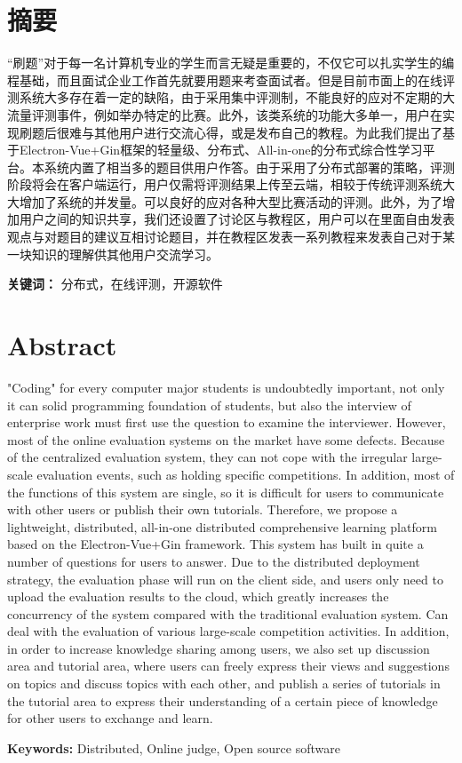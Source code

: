 \chapter*{摘要}

“刷题”对于每一名计算机专业的学生而言无疑是重要的，不仅它可以扎实学生的编程基础，而且面试企业工作首先就要用题来考查面试者。但是目前市面上的在线评测系统大多存在着一定的缺陷，由于采用集中评测制，不能良好的应对不定期的大流量评测事件，例如举办特定的比赛。此外，该类系统的功能大多单一，用户在实现刷题后很难与其他用户进行交流心得，或是发布自己的教程。为此我们提出了基于Electron-Vue+Gin框架的轻量级、分布式、All-in-one的分布式综合性学习平台。本系统内置了相当多的题目供用户作答。由于采用了分布式部署的策略，评测阶段将会在客户端运行，用户仅需将评测结果上传至云端，相较于传统评测系统大大增加了系统的并发量。可以良好的应对各种大型比赛活动的评测。此外，为了增加用户之间的知识共享，我们还设置了讨论区与教程区，用户可以在里面自由发表观点与对题目的建议互相讨论题目，并在教程区发表一系列教程来发表自己对于某一块知识的理解供其他用户交流学习。

\textbf{关键词：} 分布式，在线评测，开源软件

\chapter*{Abstract}


"Coding" for every computer major students is undoubtedly important, not only it can solid programming foundation of students, but also the interview of enterprise work must first use the question to examine the interviewer.  However, most of the online evaluation systems on the market have some defects. Because of the centralized evaluation system, they can not cope with the irregular large-scale evaluation events, such as holding specific competitions.  In addition, most of the functions of this system are single, so it is difficult for users to communicate with other users or publish their own tutorials.  Therefore, we propose a lightweight, distributed, all-in-one distributed comprehensive learning platform based on the Electron-Vue+Gin framework.  This system has built in quite a number of questions for users to answer.  Due to the distributed deployment strategy, the evaluation phase will run on the client side, and users only need to upload the evaluation results to the cloud, which greatly increases the concurrency of the system compared with the traditional evaluation system.  Can deal with the evaluation of various large-scale competition activities.  In addition, in order to increase knowledge sharing among users, we also set up discussion area and tutorial area, where users can freely express their views and suggestions on topics and discuss topics with each other, and publish a series of tutorials in the tutorial area to express their understanding of a certain piece of knowledge for other users to exchange and learn.  

\textbf{Keywords:} Distributed, Online judge, Open source software

